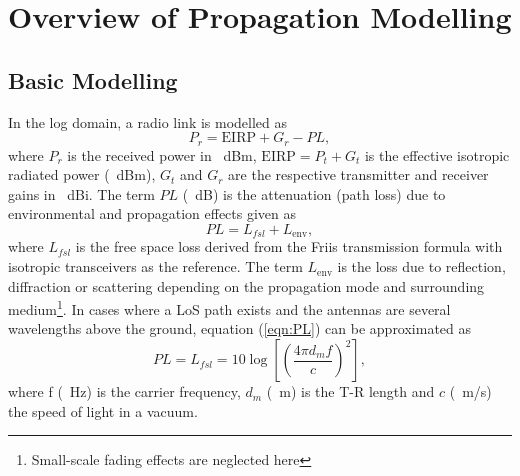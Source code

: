 \documentclass[10pt,journal,twoside]{IEEEtran}
\begin{document}
\section{Overview of Propagation Modelling}\label{Overview of Propagation Modelling}
\subsection{Basic Modelling}
In the log domain, a radio link is modelled as
\begin{equation}
\label{eqn:Pr}
P_r = \text{EIRP} + G_r - PL,
\end{equation}
where $P_r$ is the received power in \SI{}{dBm}, $\text{EIRP} = P_t + G_t$ is the effective isotropic radiated power (\SI{}{dBm}), $G_t$ and $G_r$ are the respective transmitter and receiver gains in \SI{}{dBi}. The term $PL$ (\SI{}{dB}) is the attenuation (path loss) due to environmental and propagation effects given as
\begin{equation}
\label{eqn:PL}
PL = L_{fsl} + L_{\text{env}},
\end{equation}
where $L_{fsl}$ is the free space loss derived from the Friis transmission formula   %
with isotropic transceivers as the reference. The term $L_{\text{env}}$ is the loss due to reflection, diffraction or scattering depending on the propagation mode and surrounding medium\footnote{Small-scale fading effects are neglected here}. In cases where a LoS path exists and the antennas are several wavelengths above the ground, equation (\ref{eqn:PL}) can be approximated as 
\begin{equation}
\label{eqn:FSL}
PL = L_{fsl} = 10\log\left[ \left(\dfrac{4\pi d_mf}{c}\right)^2 \right],
\end{equation}
where f (\SI{}{Hz}) is the carrier frequency, $d_m$ (\SI{}{m}) is the T-R length and $c$ (\SI{}{m/s}) the speed of light in a vacuum.
\end{document}
